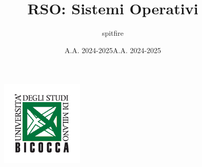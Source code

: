 \documentclass[12pt]{article}
\title{RSO: Sistemi Operativi}
\author{spitfire}
\date{A.A. 2024-2025}
\begin{document}
\begin{figure}
    \centering
    \includegraphics[width=0.35\textwidth]{Images/Logo scienze bicocca.png}
\end{figure}

\vspace{10cm}
\date{A.A. 2024-2025}


\maketitle

\newpage

\tableofcontents
\newpage
\end{document}
